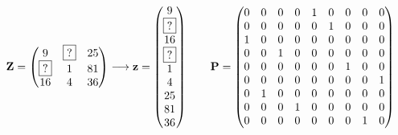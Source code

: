 \begin{figure}[H]
	\[
	\mathbf{Z} = \left(
		\begin{matrix}
			9 & \boxed{?} & 25\\
			\boxed{?} &  1 & 81\\
			16 &  4 & 36\\
		\end{matrix}
	\right)
	\longrightarrow
	\mathbf{z} = \left(
		\begin{matrix}
			9 \\ \boxed{?} \\ 16 \\ \boxed{?} \\ 1 \\ 4 \\ 25 \\ 81 \\ 36\\
		\end{matrix}
	\right)
	\qquad
	\mathbf{P} = \left(
		\begin{matrix}
			0&0&0&0&1&0&0&0&0\\
			0&0&0&0&0&1&0&0&0\\
			1&0&0&0&0&0&0&0&0\\
			0&0&1&0&0&0&0&0&0\\
			0&0&0&0&0&0&1&0&0\\
			0&0&0&0&0&0&0&0&1\\
			0&1&0&0&0&0&0&0&0\\
			0&0&0&1&0&0&0&0&0\\
			0&0&0&0&0&0&0&1&0\\
		\end{matrix}
	\right)
	\]
	

\end{figure}
